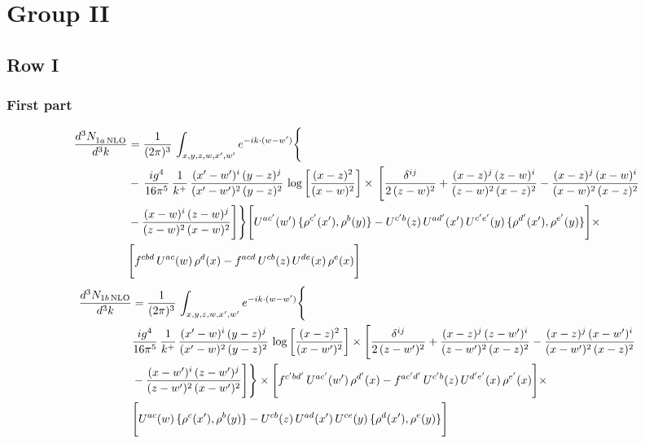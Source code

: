 \documentclass[9pt]{article}
\numberwithin{equation}{section}
\begin{document}
\section{Group II}
\subsection{Row I}
\subsubsection{First part}
\begin{align}
 \frac{d^{3}N_{1a\,\rm NLO}^{\rm}}{d^{3}k}  & =     \frac{1}{(2\pi)^{3}}\,\int_{x,y,z,w,x',w^{\prime}} e^{-ik\cdot (w-w')}\Bigg\{\notag \\
& -\, \frac{ig^{4}}{16\pi^{5}}\,\frac{1}{k^{+}}\, \frac{(x'-w')^{i}\,(y-z)^{j}}{(x'-w')^{2}\,(y-z)^{2}}\,\log{\left[\frac{(x-z)^{2}}{(x-w)^{2}}\right]}\times\,\Bigg[\frac{\delta^{ij}}{2\,(z-w)^{2}}+\frac{(x-z)^{j}\,(z-w)^{i}}{(z-w)^{2}\,(x-z)^{2}}-\frac{(x-z)^{j}\,(x-w)^{i}}{(x-w)^{2}\,(x-z)^{2}}\notag \\ & -\frac{(x-w)^{i}\,(z-w)^{j}}{(z-w)^{2}\,(x-w)^{2}}\Bigg]\Bigg\} \Bigg[U^{ac'}(w')\,\{\rho^{c'}(x'),\rho^{b}(y)\}-U^{c'b}(z)\,U^{ad'}(x')\,U^{c'e'}(y)\, \{\rho^{d'}(x'),\rho^{e'}(y)\}\Bigg]\times\notag \\ &  \Bigg[f^{cbd}\,U^{ac}(w)\,\rho^{d}(x)-f^{acd}\, U^{cb}(z)\,U^{de}(x)\,\rho^{e}(x)\Bigg]
\end{align}
\begin{align}
\frac{d^{3}N_{1b\, \rm NLO}}{d^{3}k} & =  \frac{1}{(2\pi)^{3}}\,\int_{x,y,z,w,x',w^{\prime}} e^{-ik\cdot (w-w')}\Bigg\{\notag \\
&  \frac{ig^{4}}{16\pi^{5}}\,\frac{1}{k^{+}}\, \frac{(x'-w)^{i}\,(y-z)^{j}}{(x'-w)^{2}\,(y-z)^{2}}\,\log{\left[\frac{(x-z)^{2}}{(x-w')^{2}}\right]}\times \Bigg[\frac{\delta^{ij}}{2\,(z-w')^{2}}+\frac{(x-z)^{j}\,(z-w')^{i}}{(z-w')^{2}\,(x-z)^{2}}-\frac{(x-z)^{j}\,(x-w')^{i}}{(x-w')^{2}\,(x-z)^{2}}\notag \\ & -\frac{(x-w')^{i}\,(z-w')^{j}}{(z-w')^{2}\,(x-w')^{2}}\Bigg]\Bigg\}  \times\Bigg[f^{c'bd'}\,U^{ac'}(w')\,\rho^{d'}(x)-f^{ac'd'}\, U^{c'b}(z)\,U^{d'e'}(x)\,\rho^{e'}(x)\Bigg] \times\notag \\ &  \Bigg[U^{ac}(w)\,\{\rho^{c}(x'),\rho^{b}(y)\}-U^{cb}(z)\,U^{ad}(x')\,U^{ce}(y)\, \{\rho^{d}(x'),\rho^{e}(y)\}\Bigg]
\end{align}
\end{document}
